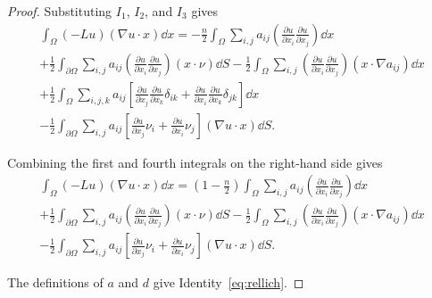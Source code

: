 \begin{proof}
  Substituting $I_1$, $I_2$, and $I_3$ gives
  \begin{multline*}
    \int_{\Omega}(-Lu)(\nabla u\cdot x)\dd{x} = -\frac{n}{2} \int_{\Omega}
    \sum_{i,j} a_{ij} \left( \frac{\partial u}{\partial x_i} \frac{\partial
    u}{\partial x_j} \right) \dd{x} \\
    + \frac{1}{2} \int_{\partial\Omega} \sum_{i,j} a_{ij} \left( \frac{\partial
    u}{\partial x_i} \frac{\partial u}{\partial x_j} \right) (x\cdot \nu )
    \dd{S} - \frac{1}{2} \int_{\Omega} \sum_{i,j} \left( \frac{\partial
    u}{\partial
    x_i} \frac{\partial u}{\partial x_j} \right)
    (x\cdot \nabla a_{ij}) \dd{x} \\
    + \frac{1}{2} \int_{\Omega} \sum_{i,j,k} a_{ij} \left[ \frac{\partial
    u}{\partial x_j} \frac{\partial u}{\partial x_k} \delta_{ik} +
    \frac{\partial u}{\partial x_i} \frac{\partial u}{\partial x_k} \delta_{jk}
    \right] \dd{x} \\
    - \frac{1}{2} \int_{\partial\Omega} \sum_{i,j} a_{ij} \left[ \frac{\partial
    u}{\partial x_j} \nu_{i} + \frac{\partial u}{\partial x_i} \nu_{j} \right]
    (\nabla u\cdot x) \dd{S}.
  \end{multline*}


  Combining the first and fourth integrals on the right-hand side gives
  \begin{multline*}
    \int_{\Omega}(-Lu)(\nabla u\cdot x)\dd{x} = (1-\frac{n}{2}) \int_{\Omega}
    \sum_{i,j} a_{ij} \left( \frac{\partial u}{\partial x_i} \frac{\partial
    u}{\partial x_j} \right) \dd{x} \\
    + \frac{1}{2} \int_{\partial\Omega} \sum_{i,j} a_{ij} \left( \frac{\partial
    u}{\partial x_i} \frac{\partial u}{\partial x_j} \right) (x\cdot \nu )
    \dd{S} - \frac{1}{2} \int_{\Omega} \sum_{i,j} \left( \frac{\partial
    u}{\partial
    x_i} \frac{\partial u}{\partial x_j} \right)
    (x\cdot \nabla a_{ij}) \dd{x} \\
    - \frac{1}{2} \int_{\partial\Omega} \sum_{i,j} a_{ij} \left[ \frac{\partial
    u}{\partial x_j} \nu_{i} + \frac{\partial u}{\partial x_i} \nu_{j} \right]
    (\nabla u\cdot x) \dd{S}.
  \end{multline*}


  The definitions of $a$ and $d$ give Identity~\eqref{eq:rellich}.


\end{proof}
